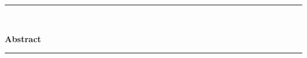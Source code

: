 \cleardoublepage
\vspace{-10cm}
\begin{vcentrepage}
	\noindent\rule[2pt]{\textwidth}{0.8pt}\\
	\begin{center}
		{\Large\textbf{}}
	\end{center}
	{\large\textbf{Abstract}}

	
	\noindent\rule[2pt]{\textwidth}{0.8pt}
\end{vcentrepage}


%